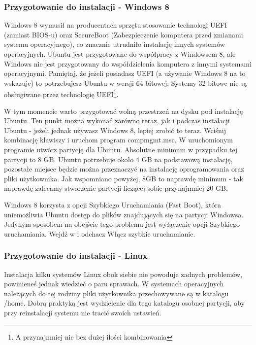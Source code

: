 \subsubsection{Przygotowanie do instalacji - Windows 8}
\label{sec:przygotowanie_windows8}
Windows 8 wymusił na producentach sprzętu stosowanie technologi UEFI (zamiast BIOS-u) oraz SecureBoot (Zabezpieczenie komputera przed zmianami systemu operacyjnego), co znacznie utrudniło instalację innych systemów operacyjnych. Ubuntu jest przygotowane do współpracy z Windowsem 8, ale Windows nie jest przygotowany do współdzielenia komputera z innymi systemami operacyjnymi. Pamiętaj, że jeżeli posiadasz UEFI (a używanie Windows 8 na to wskazuje) to potrzebujesz Ubuntu w wersji 64 bitowej. Systemy 32 bitowe nie są obsługiwane przez technologię UEFI\footnote{A przynajmniej nie bez dużej ilości kombinowania}.

W tym momencie warto przygotować wolną przestrzeń na dysku pod instalację Ubuntu. Ten punkt można wykonać zarówno teraz, jak i podczas instalacji Ubuntu - jeżeli jednak używasz Windows 8, lepiej zrobić to teraz. Wciśnij kombinację klawiszy  i uruchom program \textcolor{ubuntu_orange}{compmgmt.msc}. W uruchomionym programie utwórz partycję dla Ubuntu. Absolutne minimum w przypadku tej partycji to 8 GB. Ubuntu potrzebuje około 4 GB na podstawową instalację, pozostałe miejsce będzie można przeznaczyć na instalację oprogramowania oraz pliki użytkownika. Jak wspomniano powyżej, 8GB to naprawdę minimum - tak naprawdę zalecamy stworzenie partycji liczącej sobie przynajmniej 20 GB.

Windows 8 korzysta z opcji Szybkiego Uruchamiania (Fast Boot), która uniemożliwia Ubuntu dostęp do plików znajdujących się na partycji Windowsa. Jedynym sposobem na obejście tego problemu jest wyłączenie opcji Szybkiego uruchamiania. Wejdź w  i odchacz \textcolor{ubuntu_orange}{Włącz szybkie uruchamianie}.
\subsubsection{Przygotowanie do instalacji - Linux}
\label{sec:przygotowanie_linux}
Instalacja kilku systemów Linux obok siebie nie powoduje zadnych problemów, powinieneś jednak wiedzieć o paru sprawach. W systemach operacyjnych należących do tej rodziny pliki użytkownika przechowywane są w katalogu /home. Dobrą praktyką jest wydzielenie dla tego katalogu osobnej partycji, aby przy reinstalacji systemu nie tracić swoich ustawień.

